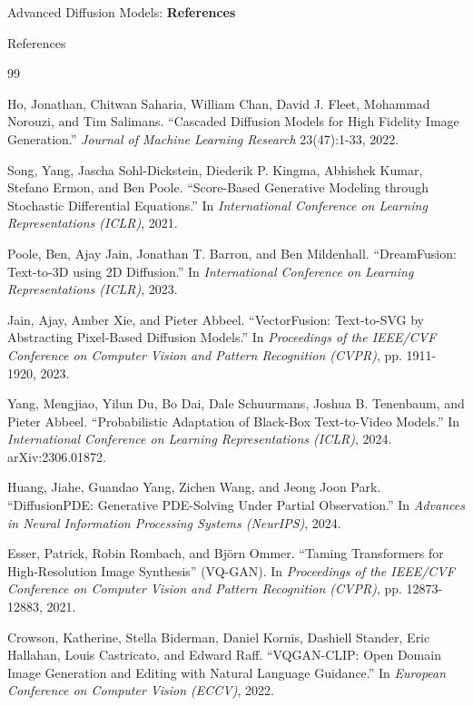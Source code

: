 \begin{frame}{}
    \LARGE Advanced Diffusion Models: \textbf{References}
\end{frame}

\begin{frame}[allowframebreaks]{References}
    \footnotesize
    \begin{thebibliography}{99}

    Ho, Jonathan, Chitwan Saharia, William Chan, David J. Fleet, Mohammad Norouzi, and Tim Salimans. ``Cascaded Diffusion Models for High Fidelity Image Generation.'' \textit{Journal of Machine Learning Research} 23(47):1-33, 2022.

    Song, Yang, Jascha Sohl-Dickstein, Diederik P. Kingma, Abhishek Kumar, Stefano Ermon, and Ben Poole. ``Score-Based Generative Modeling through Stochastic Differential Equations.'' In \textit{International Conference on Learning Representations (ICLR)}, 2021.

    Poole, Ben, Ajay Jain, Jonathan T. Barron, and Ben Mildenhall. ``DreamFusion: Text-to-3D using 2D Diffusion.'' In \textit{International Conference on Learning Representations (ICLR)}, 2023.

    Jain, Ajay, Amber Xie, and Pieter Abbeel. ``VectorFusion: Text-to-SVG by Abstracting Pixel-Based Diffusion Models.'' In \textit{Proceedings of the IEEE/CVF Conference on Computer Vision and Pattern Recognition (CVPR)}, pp. 1911-1920, 2023.

    Yang, Mengjiao, Yilun Du, Bo Dai, Dale Schuurmans, Joshua B. Tenenbaum, and Pieter Abbeel. ``Probabilistic Adaptation of Black-Box Text-to-Video Models.'' In \textit{International Conference on Learning Representations (ICLR)}, 2024. arXiv:2306.01872.

    Huang, Jiahe, Guandao Yang, Zichen Wang, and Jeong Joon Park. ``DiffusionPDE: Generative PDE-Solving Under Partial Observation.'' In \textit{Advances in Neural Information Processing Systems (NeurIPS)}, 2024.

    Esser, Patrick, Robin Rombach, and Björn Ommer. ``Taming Transformers for High-Resolution Image Synthesis'' (VQ-GAN). In \textit{Proceedings of the IEEE/CVF Conference on Computer Vision and Pattern Recognition (CVPR)}, pp. 12873-12883, 2021.

    Crowson, Katherine, Stella Biderman, Daniel Kornis, Dashiell Stander, Eric Hallahan, Louis Castricato, and Edward Raff. ``VQGAN-CLIP: Open Domain Image Generation and Editing with Natural Language Guidance.'' In \textit{European Conference on Computer Vision (ECCV)}, 2022.


\end{thebibliography}
\end{frame}
